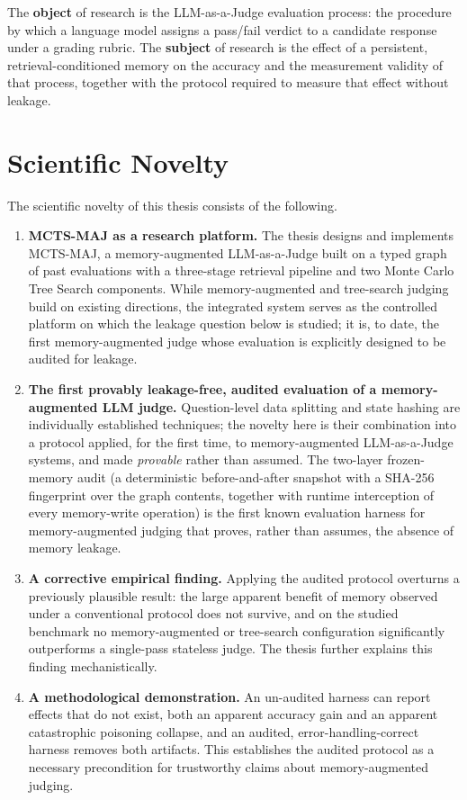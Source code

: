 \documentclass[14pt,a4paper]{extreport}
\begin{document}
The \textbf{object} of research is the LLM-as-a-Judge evaluation process: the procedure by which a language model assigns a pass/fail verdict to a candidate response under a grading rubric. The \textbf{subject} of research is the effect of a persistent, retrieval-conditioned memory on the accuracy and the measurement validity of that process, together with the protocol required to measure that effect without leakage.

\section{Scientific Novelty}

The scientific novelty of this thesis consists of the following.

\begin{enumerate}
    \item \textbf{MCTS-MAJ as a research platform.} The thesis designs and implements MCTS-MAJ, a memory-augmented LLM-as-a-Judge built on a typed graph of past evaluations with a three-stage retrieval pipeline and two Monte Carlo Tree Search components. While memory-augmented and tree-search judging build on existing directions, the integrated system serves as the controlled platform on which the leakage question below is studied; it is, to date, the first memory-augmented judge whose evaluation is explicitly designed to be audited for leakage.
    \item \textbf{The first provably leakage-free, audited evaluation of a memory-augmented LLM judge.} Question-level data splitting and state hashing are individually established techniques; the novelty here is their combination into a protocol applied, for the first time, to memory-augmented LLM-as-a-Judge systems, and made \emph{provable} rather than assumed. The two-layer frozen-memory audit (a deterministic before-and-after snapshot with a SHA-256 fingerprint over the graph contents, together with runtime interception of every memory-write operation) is the first known evaluation harness for memory-augmented judging that proves, rather than assumes, the absence of memory leakage.
    \item \textbf{A corrective empirical finding.} Applying the audited protocol overturns a previously plausible result: the large apparent benefit of memory observed under a conventional protocol does not survive, and on the studied benchmark no memory-augmented or tree-search configuration significantly outperforms a single-pass stateless judge. The thesis further explains this finding mechanistically.
    \item \textbf{A methodological demonstration.} An un-audited harness can report effects that do not exist, both an apparent accuracy gain and an apparent catastrophic poisoning collapse, and an audited, error-handling-correct harness removes both artifacts. This establishes the audited protocol as a necessary precondition for trustworthy claims about memory-augmented judging.
\end{enumerate}
\end{document}
